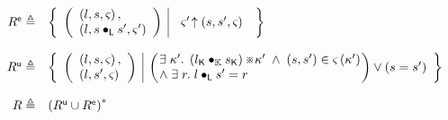 \begin{definition}[Rely]
%
\[
\begin{array}{r l}
	\extendR \eqdef & 
	\left\{
	\begin{array}{l | l}
		\left(
		\begin{array}{l}
			\left(l, s, \amod{} \right),\\
			\left(l, s \composeL s', \amod{}' \right)
		\end{array}
		\right)
		&
		\begin{array}{l}
		
			\expandsAM{\amod{}'}{s}{s'}{\amod{}}		
		
		
%		
%		
%			
%			
%						
     	


		\end{array}
	\end{array}	
	\right\}\\\\
	
	
	\updateR \eqdef & 
	\left\{
	\begin{array}{l | l}
		\left(
		\begin{array}{l}
			\left(l, s, \amod{} \right),\\
			\left(l, s', \amod{} \right)
		\end{array}
		\right)
		&
		\left(
		\hspace*{-0.15cm}
		\begin{array}{l}
			\exsts{\ca{}'} \left( \capPart{l} \composeCap \capPart{s} \right) \separate \ca{}' \;\land\; (s, s') \in \amod{} \left(\ca{}'\right) \\
			\land\; \exsts{r} l \composeL s' = r
		\end{array}
		\hspace*{-0.15cm}
		\right)
		\lor
		(s = s')
	\end{array}	
	\right\}\\\\
	
	\rely \eqdef & \left(\updateR \cup \extendR \right)^{*}
\end{array}
\]
%
\end{definition}
